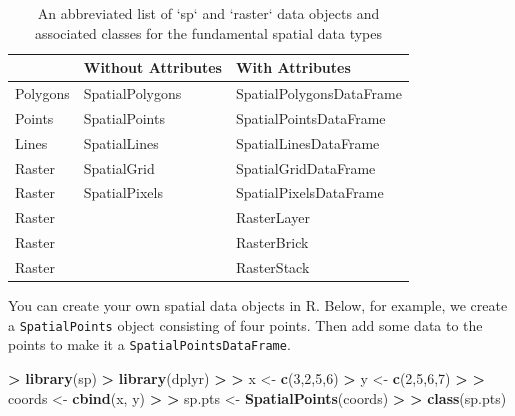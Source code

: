 \documentclass[]{krantz}
\makeatletter
\newenvironment{Shaded}{\begin{snugshade}}{\end{snugshade}}
\newcommand{\KeywordTok}[1]{\textcolor[rgb]{0.27,0.27,0.27}{\textbf{#1}}}
\newcommand{\DecValTok}[1]{\textcolor[rgb]{0.06,0.06,0.06}{#1}}
\newcommand{\StringTok}[1]{\textcolor[rgb]{0.5,0.5,0.5}{#1}}
\newcommand{\OperatorTok}[1]{\textcolor[rgb]{0.43,0.43,0.43}{\textbf{#1}}}
\newcommand{\ErrorTok}[1]{\textcolor[rgb]{0.14,0.14,0.14}{\textbf{#1}}}
\newcommand{\NormalTok}[1]{#1}
\newenvironment{kframe}{%
\medskip{}
\setlength{\fboxsep}{.8em}
 \def\at@end@of@kframe{}%
 \ifinner\ifhmode%
  \def\at@end@of@kframe{\end{minipage}}%
  \begin{minipage}{\columnwidth}%
 \fi\fi%
 \def\FrameCommand##1{\hskip\@totalleftmargin \hskip-\fboxsep
 \colorbox{shadecolor}{##1}\hskip-\fboxsep
     \hskip-\linewidth \hskip-\@totalleftmargin \hskip\columnwidth}%
 \MakeFramed {\advance\hsize-\width
   \@totalleftmargin\z@ \linewidth\hsize
   \@setminipage}}%
 {\par\unskip\endMakeFramed%
 \at@end@of@kframe}
\renewenvironment{Shaded}{\begin{kframe}}{\end{kframe}}
\makeatother
\begin{document}
\begin{table}[t]

\caption{\label{tab:spatialObjs}An abbreviated list of `sp` and `raster` data objects and associated classes for the fundamental spatial data types}
\centering
\begin{tabular}{lll}
\toprule
 & Without Attributes & With Attributes\\
\midrule
Polygons & SpatialPolygons & SpatialPolygonsDataFrame\\
Points & SpatialPoints & SpatialPointsDataFrame\\
Lines & SpatialLines & SpatialLinesDataFrame\\
Raster & SpatialGrid & SpatialGridDataFrame\\
Raster & SpatialPixels & SpatialPixelsDataFrame\\
\addlinespace
Raster &  & RasterLayer\\
Raster &  & RasterBrick\\
Raster &  & RasterStack\\
\bottomrule
\end{tabular}
\end{table}

You can create your own spatial data objects in R. Below, for example,
we create a \texttt{SpatialPoints} object consisting of four points.
Then add some data to the points to make it a
\texttt{SpatialPointsDataFrame}.

\begin{Shaded}
\begin{Highlighting}[]
\OperatorTok{>}\StringTok{ }\KeywordTok{library}\NormalTok{(sp)}
\OperatorTok{>}\StringTok{ }\KeywordTok{library}\NormalTok{(dplyr)}
\OperatorTok{>}\StringTok{ }
\ErrorTok{>}\StringTok{ }\NormalTok{x <-}\StringTok{ }\KeywordTok{c}\NormalTok{(}\DecValTok{3}\NormalTok{,}\DecValTok{2}\NormalTok{,}\DecValTok{5}\NormalTok{,}\DecValTok{6}\NormalTok{)}
\OperatorTok{>}\StringTok{ }\NormalTok{y <-}\StringTok{ }\KeywordTok{c}\NormalTok{(}\DecValTok{2}\NormalTok{,}\DecValTok{5}\NormalTok{,}\DecValTok{6}\NormalTok{,}\DecValTok{7}\NormalTok{)}
\OperatorTok{>}\StringTok{ }
\ErrorTok{>}\StringTok{ }\NormalTok{coords <-}\StringTok{ }\KeywordTok{cbind}\NormalTok{(x, y)}
\OperatorTok{>}\StringTok{ }
\ErrorTok{>}\StringTok{ }\NormalTok{sp.pts <-}\StringTok{ }\KeywordTok{SpatialPoints}\NormalTok{(coords)}
\OperatorTok{>}\StringTok{ }
\ErrorTok{>}\StringTok{ }\KeywordTok{class}\NormalTok{(sp.pts)}
\end{Highlighting}
\end{Shaded}
\end{document}
